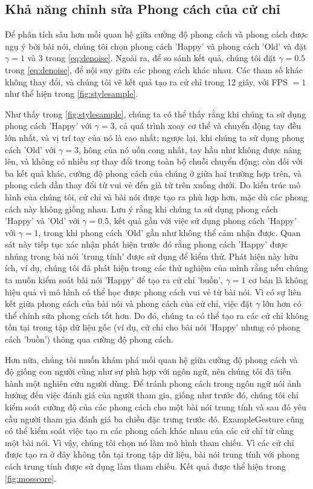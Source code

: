 \subsection{Khả năng chỉnh sửa Phong cách của cử chỉ}

Để phân tích sâu hơn mối quan hệ giữa cường độ phong cách và phong cách được ngụ ý bởi bài nói, chúng tôi chọn phong cách 'Happy' và phong cách 'Old' và đặt $\gamma=1$ và 3 trong \autoref{eq:denoise}. Ngoài ra, để so sánh kết quả, chúng tôi đặt $\gamma=0.5$ trong \autoref{eq:denoise}, để nội suy giữa các phong cách khác nhau. Các tham số khác không thay đổi, và chúng tôi vẽ kết quả tạo ra cử chỉ trong 12 giây, với FPS $=1$ như thể hiện trong \autoref{fig:stylesample}.


Như thấy trong \autoref{fig:stylesample}, chúng ta có thể thấy rằng khi chúng ta sử dụng phong cách 'Happy' với $\gamma=3$, cả quá trình xoay cơ thể và chuyển động tay đều lớn nhất, và vị trí tay của nó là cao nhất; ngược lại, khi chúng ta sử dụng phong cách 'Old' với $\gamma=3$, hông của nó uốn cong nhất, tay hầu như không được nâng lên, và không có nhiều sự thay đổi trong toàn bộ chuỗi chuyển động; còn đối với ba kết quả khác, cường độ phong cách của chúng ở giữa hai trường hợp trên, và phong cách dần thay đổi từ vui vẻ đến già từ trên xuống dưới. Do kiến trúc mô hình của chúng tôi, cử chỉ và bài nói được tạo ra phù hợp hơn, mặc dù các phong cách này không giống nhau. Lưu ý rằng khi chúng ta sử dụng phong cách 'Happy' và 'Old' với $\gamma=0.5$, kết quả gần với việc sử dụng phong cách 'Happy' với $\gamma=1$, trong khi phong cách 'Old' gần như không thể cảm nhận được. Quan sát này tiếp tục xác nhận phát hiện trước đó rằng phong cách 'Happy' được nhúng trong bài nói 'trung tính' được sử dụng để kiểm thử. Phát hiện này hữu ích, ví dụ, chúng tôi đã phát hiện trong các thử nghiệm của mình rằng nếu chúng ta muốn kiểm soát bài nói 'Happy' để tạo ra cử chỉ 'buồn', $\gamma=1$ cơ bản là không hiệu quả vì mô hình có thể học được phong cách vui vẻ từ bài nói. Vì có sự liên kết giữa phong cách của bài nói và phong cách của cử chỉ, việc đặt $\gamma$ lớn hơn có thể chỉnh sửa phong cách tốt hơn. Do đó, chúng ta có thể tạo ra các cử chỉ không tồn tại trong tập dữ liệu gốc (ví dụ, cử chỉ cho bài nói 'Happy' nhưng có phong cách 'buồn') thông qua cường độ phong cách.


Hơn nữa, chúng tôi muốn khám phá mối quan hệ giữa cường độ phong cách và độ giống con người cũng như sự phù hợp với ngôn ngữ, nên chúng tôi đã tiến hành một nghiên cứu người dùng. Để tránh phong cách trong ngôn ngữ nói ảnh hưởng đến việc đánh giá của người tham gia, giống như trước đó, chúng tôi chỉ kiểm soát cường độ của các phong cách cho một bài nói trung tính và sau đó yêu cầu người tham gia đánh giá ba chiều đặc trưng trước đó. ExampleGesture \cite{ghorbani2023zeroeggs} cũng có thể kiểm soát việc tạo ra các phong cách khác nhau của các cử chỉ từ cùng một bài nói. Vì vậy, chúng tôi chọn nó làm mô hình tham chiếu. Vì các cử chỉ được tạo ra ở đây không tồn tại trong tập dữ liệu, bài nói trung tính với phong cách trung tính được sử dụng làm tham chiếu. Kết quả được thể hiện trong \autoref{fig:mosscore}.


